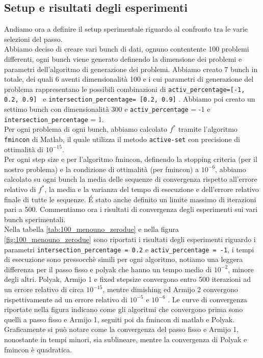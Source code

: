 \documentclass[12pt]{extarticle}
\begin{document}
\subsection{Setup e risultati degli esperimenti}
Andiamo ora a definire il setup sperimentale riguardo al confronto tra le varie selezioni del passo.\\
Abbiamo deciso di creare vari bunch di dati, ognuno contentente 100 problemi differenti, ogni bunch viene generato definendo la dimensione dei problemi e parametri dell'algoritmo di generazione dei problemi. Abbiamo creato 7 bunch in totale, dei quali 6 aventi dimensionalità 100 e i cui parametri di generazione del problema rappresentano le possibili combinazioni di \texttt{activ\_percentage=[-1, 0.2, 0.9] } e \texttt{intersection\_percentage= [0.2, 0.9]} . Abbiamo poi creato un settimo bunch con dimensionalità 300 e \texttt{activ\_percentage} = -1 e  \texttt{intersection\_percentage} = 1.\\
Per ogni problema di ogni bunch, abbiamo calcolato $f^*$ tramite l'algoritmo \texttt{fmincon} di Matlab, il quale utilizza il metodo \texttt{active-set} con precisione di ottimalità di $10^{-15}$.\\
Per ogni step size e per l'algoritmo fmincon, definendo la stopping criteria (per il nostro problema) e la condizione di ottimalità (per fmincon) a $10^{-6}$, abbiamo calcolato su ogni bunch la media delle sequenze di convergenza rispetto all'errore relativo di $f^*$, la media e la varianza del tempo di esecuzione e dell'errore relativo finale di tutte le sequenze. \'E stato anche definito un limite massimo di iterazioni pari a 500. Commentiamo ora i risultati di convergenza degli esperimenti sui vari bunch sperimentali. \\
Nella tabella \ref{tab:100_menouno_zerodue} e nella figura \ref{fig:100_menouno_zerodue} sono riportati i risultati degli esperimenti riguardo i parametri \texttt{intersection\_percentage = 0.2} e \texttt{activ\_percentage = -1}, i tempi di esecuzione sono pressocchè simili per ogni algoritmo, notiamo una leggera differenza per il passo fisso e polyak che hanno un tempo medio di $10^{-2}$, minore degli altri.  Polyak, Armijo 1 e fixed stepsize convergono entro 500 iterazioni ad un errore relativo di circa $10^{-15}$, mentre dimishing ed Armijo 2 convergono rispettivamente ad un errore relativo di $10^{-5}$ e $10^{-6}$ . Le curve di convergenza riportate nella figura indicano come gli algoritmi che convergono prima sono quelli a passo fisso e Armijo 1, seguiti poi da fmincon di matlab e Polyak. Graficamente si può notare come la convergenza del passo fisso e Armijo 1, nonostante in tempi minori, sia sublineare, mentre la convergenza di Polyak e fmincon è quadratica.\\
\end{document}
